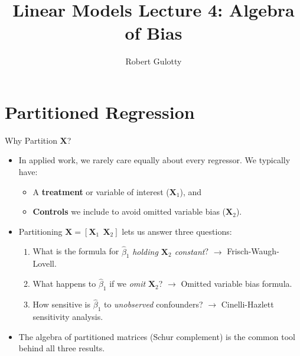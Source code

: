 \documentclass[aspectratio=169, handout, t]{beamer}
\title[PLSC 30700]{Linear Models Lecture 4: Algebra of Bias}
\author{Robert Gulotty}
\institute[Chicago]{University of Chicago}
\numberwithin{equation}{section}
\begin{document}
\begin{frame}
\maketitle
\end{frame}

\section{Partitioned Regression}

\begin{frame}{Why Partition $\bm{X}$?}
\begin{itemize}
\item In applied work, we rarely care equally about every regressor. We typically have:
\begin{itemize}
\item A \textbf{treatment} or variable of interest ($\bm{X}_1$), and
\item \textbf{Controls} we include to avoid omitted variable bias ($\bm{X}_2$).
\end{itemize}\pause
\item Partitioning $\bm{X}=[\bm{X}_1\ \ \bm{X}_2]$ lets us answer three questions:
\begin{enumerate}
\item What is the formula for $\hat{\beta}_1$ \emph{holding $\bm{X}_2$ constant}? $\to$ Frisch-Waugh-Lovell.
\item What happens to $\hat{\beta}_1$ if we \emph{omit} $\bm{X}_2$? $\to$ Omitted variable bias formula.
\item How sensitive is $\hat{\beta}_1$ to \emph{unobserved} confounders? $\to$ Cinelli-Hazlett sensitivity analysis.
\end{enumerate}\pause
\item The algebra of partitioned matrices (Schur complement) is the common tool behind all three results.
\end{itemize}
\end{frame}
\end{document}
